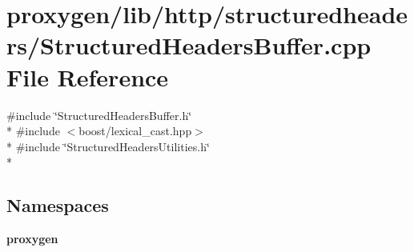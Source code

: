 \section{proxygen/lib/http/structuredheaders/\+Structured\+Headers\+Buffer.cpp File Reference}
\label{StructuredHeadersBuffer_8cpp}
{\ttfamily \#include \char`\"{}Structured\+Headers\+Buffer.\+h\char`\"{}}\\*
{\ttfamily \#include $<$boost/lexical\+\_\+cast.\+hpp$>$}\\*
{\ttfamily \#include \char`\"{}Structured\+Headers\+Utilities.\+h\char`\"{}}\\*
\subsection*{Namespaces}
\begin{DoxyCompactItemize}
\item 
 {\bf proxygen}
\end{DoxyCompactItemize}
